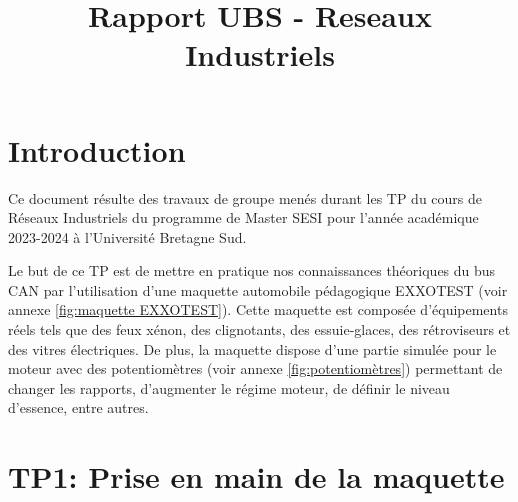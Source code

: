 \documentclass{rapportECC}
\title{Rapport UBS - Reseaux Industriels} %
\begin{document}





        
\fairemarges %
\fairepagedegarde %
\tabledematieres %



\section{Introduction} 

Ce document résulte des travaux de groupe menés durant les TP du cours de Réseaux Industriels du programme de Master SESI pour l'année académique 2023-2024 à l'Université Bretagne Sud.

Le but de ce TP est de mettre en pratique nos connaissances théoriques du bus CAN par l'utilisation d'une maquette automobile pédagogique EXXOTEST (voir annexe \ref{fig:maquette EXXOTEST}). Cette maquette est composée d'équipements réels tels que des feux xénon, des clignotants, des essuie-glaces, des rétroviseurs et des vitres électriques. De plus, la maquette dispose d'une partie simulée pour le moteur avec des potentiomètres (voir annexe \ref{fig:potentiomètres}) permettant de changer les rapports, d'augmenter le régime moteur, de définir le niveau d'essence, entre autres.


\section{TP1: Prise en main de la maquette}

\end{document}

